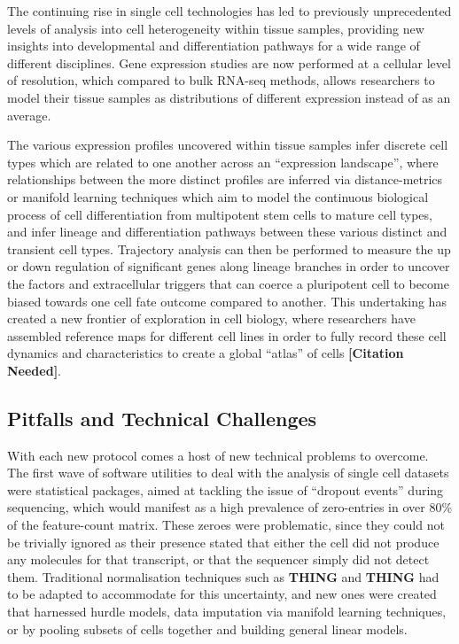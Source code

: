 \documentclass[a4paper,num-refs]{oup-contemporary}
\newcommand{\citeneed}{{\bf\tiny [Citation Needed]}}
\newcommand{\thing}{{\bf THING}}
\begin{document}
The continuing rise in single cell technologies has led to previously unprecedented levels of analysis into cell heterogeneity within tissue samples, providing new insights into developmental and differentiation pathways for a wide range of different disciplines. Gene expression studies are now performed at a cellular level of resolution, which compared to bulk RNA-seq methods, allows researchers to model their tissue samples as distributions of different expression instead of as an average.

The various expression profiles uncovered within tissue samples infer discrete cell types which are related to one another across an ``expression landscape'', where relationships between the more distinct profiles are inferred via distance-metrics or manifold learning techniques which aim to model the continuous biological process of cell differentiation from multipotent stem cells to mature cell types, and infer lineage and differentiation pathways between these various distinct and transient cell types. Trajectory analysis can then be performed to measure the up or down regulation of significant genes along lineage branches in order to uncover the factors and extracellular triggers that can coerce a pluripotent cell to become biased towards one cell fate outcome compared to another. This undertaking has created a new frontier of exploration in cell biology, where researchers have assembled reference maps for different cell lines in order to fully record these cell dynamics and characteristics to create a global ``atlas'' of cells \citeneed.

\subsection{Pitfalls and Technical Challenges}
With each new protocol comes a host of new technical problems to overcome. The first wave of software utilities to deal with the analysis of single cell datasets were statistical packages, aimed at tackling the issue of ``dropout events'' during sequencing, which would manifest as a high prevalence of zero-entries in over 80\% of the feature-count matrix. These zeroes were problematic, since they could not be trivially ignored as their presence stated that either the cell did not produce any molecules for that transcript, or that the sequencer simply did not detect them. Traditional normalisation techniques such as \thing{} and \thing{} had to be adapted to accommodate for this uncertainty, and new ones were created that harnessed hurdle models, data imputation via manifold learning techniques, or by pooling subsets of cells together and building general linear models.
\end{document}
